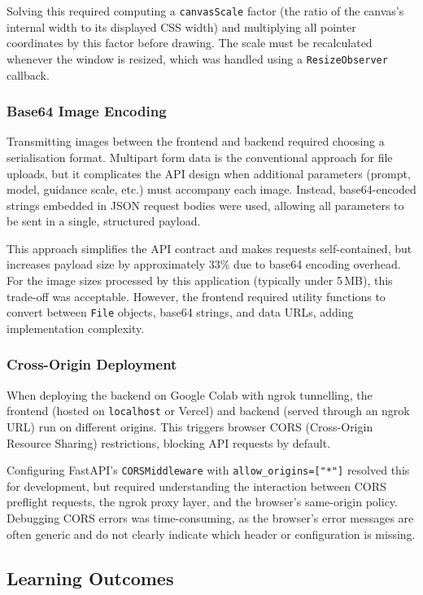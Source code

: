 \documentclass[12pt,a4paper]{report}
\begin{document}
Solving this required computing a \texttt{canvasScale} factor (the ratio of the canvas's internal width to its displayed CSS width) and multiplying all pointer coordinates by this factor before drawing. The scale must be recalculated whenever the window is resized, which was handled using a \texttt{ResizeObserver} callback.

\subsubsection{Base64 Image Encoding}

Transmitting images between the frontend and backend required choosing a serialisation format. Multipart form data is the conventional approach for file uploads, but it complicates the API design when additional parameters (prompt, model, guidance scale, etc.) must accompany each image. Instead, base64-encoded strings embedded in JSON request bodies were used, allowing all parameters to be sent in a single, structured payload.

This approach simplifies the API contract and makes requests self-contained, but increases payload size by approximately 33\% due to base64 encoding overhead. For the image sizes processed by this application (typically under 5\,MB), this trade-off was acceptable. However, the frontend required utility functions to convert between \texttt{File} objects, base64 strings, and data URLs, adding implementation complexity.

\subsubsection{Cross-Origin Deployment}

When deploying the backend on Google Colab with ngrok tunnelling, the frontend (hosted on \texttt{localhost} or Vercel) and backend (served through an ngrok URL) run on different origins. This triggers browser CORS (Cross-Origin Resource Sharing) restrictions, blocking API requests by default.

Configuring FastAPI's \texttt{CORSMiddleware} with \texttt{allow\_origins=["*"]} resolved this for development, but required understanding the interaction between CORS preflight requests, the ngrok proxy layer, and the browser's same-origin policy. Debugging CORS errors was time-consuming, as the browser's error messages are often generic and do not clearly indicate which header or configuration is missing.

\subsection{Learning Outcomes}
\end{document}

